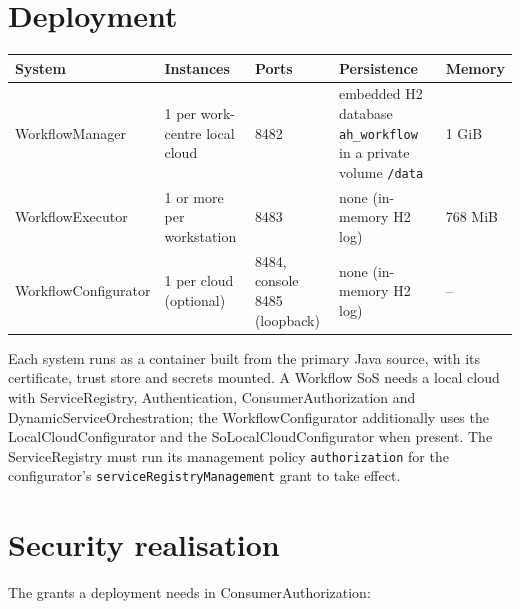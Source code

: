 \documentclass[a4paper]{arrowhead}
\begin{document}
\section{Deployment}
\label{sec:deployment}

{\small
\begin{longtable}{|p{3.2cm}|p{3.6cm}|p{3.0cm}|p{4.4cm}|p{1.6cm}|}

\hline
\rowcolor{gray!33} System & Instances & Ports & Persistence & Memory \\ \hline
\endhead
WorkflowManager & 1 per work-centre local cloud & 8482 & embedded H2 database \texttt{ah\_workflow} in a private volume \texttt{/data} & 1 GiB \\ \hline
WorkflowExecutor & 1 or more per workstation & 8483 & none (in-memory H2 log) & 768 MiB \\ \hline
WorkflowConfigurator & 1 per cloud (optional) & 8484, console 8485 (loopback) & none (in-memory H2 log) & -- \\ \hline
\end{longtable}
}

Each system runs as a container built from the primary Java source, with its certificate, trust store and secrets
mounted. A Workflow SoS needs a local cloud with ServiceRegistry, Authentication, ConsumerAuthorization and
DynamicServiceOrchestration; the WorkflowConfigurator additionally uses the LocalCloudConfigurator and the
SoLocalCloudConfigurator when present. The ServiceRegistry must run its management policy \texttt{authorization} for the
configurator's \texttt{service\allowbreak{}Registry\allowbreak{}Management} grant to take effect.

\section{Security realisation}
\label{sec:security}
The grants a deployment needs in ConsumerAuthorization:
\end{document}

